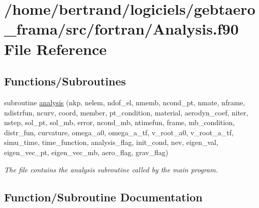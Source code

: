 \hypertarget{_analysis_8f90}{}\section{/home/bertrand/logiciels/gebtaero\+\_\+frama/src/fortran/\+Analysis.f90 File Reference}
\label{_analysis_8f90}
\subsection*{Functions/\+Subroutines}
\begin{DoxyCompactItemize}
\item 
subroutine \hyperlink{_analysis_8f90_aaee5e32aa3983fc7dd592bc71d7d5494}{analysis} (nkp, nelem, ndof\+\_\+el, nmemb, ncond\+\_\+pt, nmate, nframe, ndistrfun, ncurv, coord, member, pt\+\_\+condition, material, aerodyn\+\_\+coef, niter, nstep, sol\+\_\+pt, sol\+\_\+mb, error, ncond\+\_\+mb, ntimefun, frame, mb\+\_\+condition, distr\+\_\+fun, curvature, omega\+\_\+a0, omega\+\_\+a\+\_\+tf, v\+\_\+root\+\_\+a0, v\+\_\+root\+\_\+a\+\_\+tf, simu\+\_\+time, time\+\_\+function, analysis\+\_\+flag, init\+\_\+cond, nev, eigen\+\_\+val, eigen\+\_\+vec\+\_\+pt, eigen\+\_\+vec\+\_\+mb, aero\+\_\+flag, grav\+\_\+flag)
\begin{DoxyCompactList}\small\item\em The file contains the analysis subroutine called by the main program. \end{DoxyCompactList}\end{DoxyCompactItemize}


\subsection{Function/\+Subroutine Documentation}
\mbox{\label{_analysis_8f90_aaee5e32aa3983fc7dd592bc71d7d5494}} 
